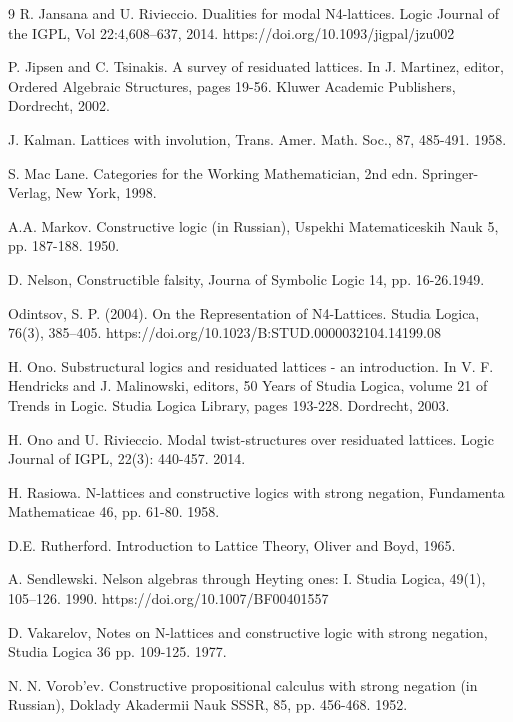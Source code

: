 \documentclass[pdflatex,sn-mathphys-num]{sn-jnl}%
\theoremstyle{thmstyleone}%
\theoremstyle{thmstyletwo}%
\theoremstyle{thmstylethree}%
\begin{document}
\begin{thebibliography}{9}
 R. Jansana and U. Rivieccio. Dualities for modal N4-lattices. Logic Journal of the IGPL, Vol 22:4,608–637, 2014. https://doi.org/10.1093/jigpal/jzu002




P. Jipsen and C. Tsinakis. A survey of residuated lattices. In J. Martinez, editor, Ordered Algebraic Structures, pages 19-56. Kluwer Academic Publishers, Dordrecht, 2002. 

J. Kalman. Lattices with involution, Trans. Amer. Math. Soc., 87, 485-491. 1958.


S. Mac Lane. Categories for the Working Mathematician, 2nd edn. Springer-Verlag, New York, 1998.

A.A. Markov. Constructive logic (in Russian), Uspekhi Matematiceskih Nauk 5, pp. 187-188. 1950.

D. Nelson, Constructible falsity, Journa of Symbolic Logic 14, pp. 16-26.1949.

 Odintsov, S. P. (2004). On the Representation of N4-Lattices. Studia Logica, 76(3), 385–405. https://doi.org/10.1023/B:STUD.0000032104.14199.08

H. Ono. Substructural logics and residuated lattices - an introduction. In V. F. Hendricks and J. Malinowski, editors, 50 Years of Studia Logica, volume 21 of Trends in Logic. Studia Logica
Library, pages 193-228. Dordrecht, 2003.

H. Ono and U. Rivieccio. Modal twist-structures over residuated lattices. Logic Journal of IGPL, 22(3): 440-457. 2014.

 H. Rasiowa. N-lattices and constructive logics with strong negation, Fundamenta Mathematicae 46, pp. 61-80.  1958.

D.E. Rutherford. Introduction to Lattice Theory, Oliver and Boyd, 1965.

 A. Sendlewski. Nelson algebras through Heyting ones: I. Studia Logica, 49(1), 105–126. 1990. https://doi.org/10.1007/BF00401557

 D. Vakarelov, Notes on N-lattices and constructive logic with strong negation, Studia Logica 36  pp. 109-125. 1977.

N. N. Vorob'ev.  Constructive propositional calculus with strong negation (in
Russian), Doklady Akadermii Nauk SSSR, 85, pp. 456-468. 1952.


\end{thebibliography}
\end{document}

